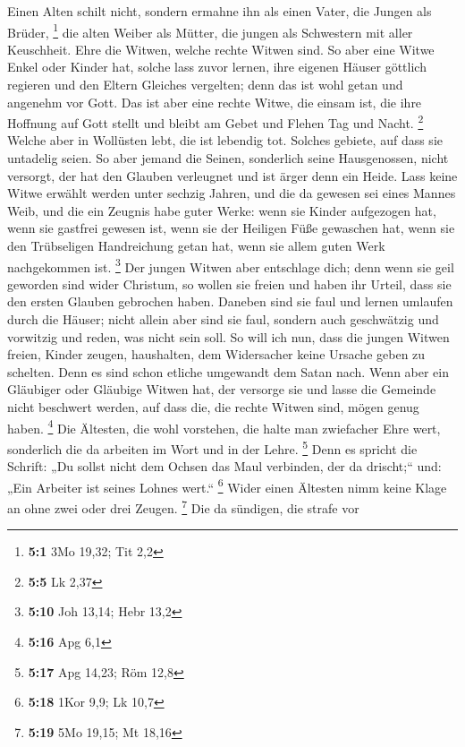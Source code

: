  Einen Alten schilt nicht, sondern ermahne ihn als einen
Vater, die Jungen als Brüder, \footnote{\textbf{5:1} 3Mo 19,32; Tit 2,2}
 die alten Weiber als Mütter, die jungen als Schwestern
mit aller Keuschheit.  Ehre die Witwen, welche rechte
Witwen sind.  So aber eine Witwe Enkel oder Kinder hat,
solche lass zuvor lernen, ihre eigenen Häuser göttlich regieren und den
Eltern Gleiches vergelten; denn das ist wohl getan und angenehm vor
Gott.  Das ist aber eine rechte Witwe, die einsam ist, die
ihre Hoffnung auf Gott stellt und bleibt am Gebet und Flehen Tag und
Nacht. \footnote{\textbf{5:5} Lk 2,37}  Welche aber in
Wollüsten lebt, die ist lebendig tot.  Solches gebiete,
auf dass sie untadelig seien.  So aber jemand die Seinen,
sonderlich seine Hausgenossen, nicht versorgt, der hat den Glauben
verleugnet und ist ärger denn ein Heide.  Lass keine Witwe
erwählt werden unter sechzig Jahren, und die da gewesen sei eines Mannes
Weib,  und die ein Zeugnis habe guter Werke: wenn sie
Kinder aufgezogen hat, wenn sie gastfrei gewesen ist, wenn sie der
Heiligen Füße gewaschen hat, wenn sie den Trübseligen Handreichung getan
hat, wenn sie allem guten Werk nachgekommen ist. \footnote{\textbf{5:10}
  Joh 13,14; Hebr 13,2}  Der jungen Witwen aber
entschlage dich; denn wenn sie geil geworden sind wider Christum, so
wollen sie freien  und haben ihr Urteil, dass sie den
ersten Glauben gebrochen haben.  Daneben sind sie faul
und lernen umlaufen durch die Häuser; nicht allein aber sind sie faul,
sondern auch geschwätzig und vorwitzig und reden, was nicht sein soll.
 So will ich nun, dass die jungen Witwen freien, Kinder
zeugen, haushalten, dem Widersacher keine Ursache geben zu schelten.
 Denn es sind schon etliche umgewandt dem Satan nach.
 Wenn aber ein Gläubiger oder Gläubige Witwen hat, der
versorge sie und lasse die Gemeinde nicht beschwert werden, auf dass
die, die rechte Witwen sind, mögen genug haben. \footnote{\textbf{5:16}
  Apg 6,1}  Die Ältesten, die wohl vorstehen, die halte
man zwiefacher Ehre wert, sonderlich die da arbeiten im Wort und in der
Lehre. \footnote{\textbf{5:17} Apg 14,23; Röm 12,8}  Denn
es spricht die Schrift: „Du sollst nicht dem Ochsen das Maul verbinden,
der da drischt;`` und: „Ein Arbeiter ist seines Lohnes wert.``
\footnote{\textbf{5:18} 1Kor 9,9; Lk 10,7}  Wider einen
Ältesten nimm keine Klage an ohne zwei oder drei Zeugen. \footnote{\textbf{5:19}
  5Mo 19,15; Mt 18,16}  Die da sündigen, die strafe vor
